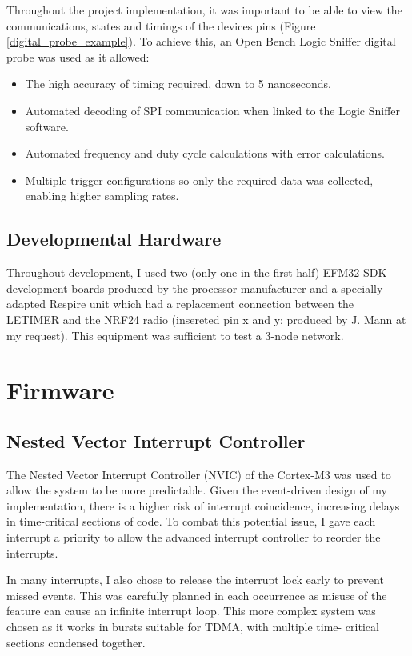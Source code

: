 Throughout the project implementation, it was important to be able to view the communications,
states and timings of the devices pins (Figure \ref{digital_probe_example}). To achieve this, an Open Bench Logic Sniffer digital probe was
used as it allowed:
\begin{itemize}
  \item The high accuracy of timing required, down to 5 nanoseconds.
  \item Automated decoding of SPI communication when linked to the Logic Sniffer software.
  \item Automated frequency and duty cycle calculations with error calculations.
  \item Multiple trigger configurations so only the required data was collected, enabling higher
        sampling rates.
\end{itemize}

\subsection{Developmental Hardware}
Throughout development, I used two (only one in the first half) EFM32-SDK development
boards produced by the processor manufacturer and a specially-adapted Respire unit
which had a replacement connection between the \ac{LETIMER} and the \ac{NRF24} radio
(insereted pin x   and y; produced by J. Mann at my request).
This equipment was sufficient to test a 3-node network.

\section{Firmware}

\subsection{Nested Vector Interrupt Controller}
The Nested Vector Interrupt Controller (NVIC) of the Cortex-M3 was used to allow the system to be
more predictable. Given the event-driven design of my implementation, there is a higher risk of
interrupt coincidence, increasing delays in time-critical sections of code. To combat this potential
issue, I gave each interrupt a priority to allow the advanced interrupt controller to reorder the
interrupts.

In many interrupts, I also chose to release the interrupt lock early to prevent missed events. This was
carefully planned in each occurrence as misuse of the feature can cause an infinite interrupt loop.
This more complex system was chosen as it works in bursts suitable for TDMA, with multiple time-
critical sections condensed together.

